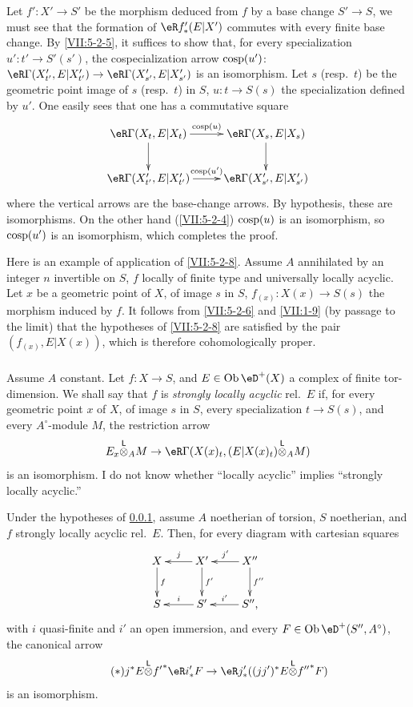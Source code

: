 Let $f':X'\to S'$ be the morphism deduced from $f$ by a base change
$S'\to S$, we must see that the formation of $\eR f_\ast'(E|X')$ commutes
with every finite base change. By \ref{VII:5-2-5}, it suffices to
show that, for every specialization $u':t'\to S'(s')$, the
cospecialization arrow $\operatorname{cosp}(u')$:
$\eR\Gamma(X_{t'}',E|X_{t'}') \to \eR\Gamma(X_{s'}',E|X_{s'}')$ is an
isomorphism. Let $s$ (resp.\ $t$) be the geometric point image of $s$
(resp.\ $t$) in $S$, $u:t\to S(s)$ the specialization defined by $u'$.
One easily sees that one has a commutative square
\[\xymatrix{
  \eR\Gamma(X_t,E|X_t) \ar[r]^-{\cosp(u)} \ar[d]
    & \eR\Gamma(X_s,E|X_s) \ar[d] \\
  \eR\Gamma(X_{t'}',E|X_{t'}') \ar[r]^-{\cosp(u')}
    & \eR\Gamma(X_{s'}',E|X_{s'}')
}\]
where the vertical arrows are the base-change arrows. By
hypothesis, these are isomorphisms. On the other hand (\ref{VII:5-2-4})
$\operatorname{cosp}(u)$ is an isomorphism, so $\operatorname{cosp}(u')$ is an isomorphism, which
completes the proof.

Here is an example of application of \ref{VII:5-2-8}. Assume $A$ annihilated by
an integer $n$ invertible on $S$, $f$ locally of finite type and
universally locally acyclic. Let $x$ be a geometric point of
$X$, of image $s$ in $S$, $f_{(x)}:X(x)\to S(s)$ the morphism induced by $f$.
It follows from \ref{VII:5-2-6} and \ref{VII:1-9} (by passage to the limit)
that the hypotheses of \ref{VII:5-2-8} are satisfied by the pair
$(f_{(x)},E|X(x))$, which is therefore cohomologically proper.




\subsubsection{}\label{VII:5-2-9}

Assume $A$ constant. Let $f:X\to S$, and $E\in\ob\eD^+(X)$ a complex of
finite tor-dimension. We shall say that $f$ is \emph{strongly locally
acyclic} rel.\ $E$ if, for every geometric point $x$ of $X$,
of image $s$ in $S$, every specialization $t\to S(s)$, and every
$A^\circ$-module $M$, the restriction arrow
\[
  E_x\lotimes_A M \to \eR\Gamma(X(x)_t,(E|X(x)_t)\lotimes_A M)
\]
is an isomorphism. I do not know whether ``locally acyclic'' implies
``strongly locally acyclic.''




\begin{proposition}\label{VII:5-2-10}
Under the hypotheses of \ref{VII:5-2-9}, assume $A$ noetherian of
torsion, $S$ noetherian, and $f$ strongly locally acyclic rel.\ $E$.
Then, for every diagram with cartesian squares
\[\xymatrix{
  X \ar[d]^-f
    & \ar[l]_-j X' \ar[d]^-{f'}
    & \ar[l]_-{j'} X'' \ar[d]^-{f''} \\
  S
    & \ar[l]_-i S'
    & \ar[l]_-{i'} S'' \text{,}
}\]
with $i$ quasi-finite and $i'$ an open immersion, and every
$F\in\ob\eD^+(S'',A^\circ)$, the canonical arrow
\begin{equation*}\tag{$*$}\label{VII:eq:5-2-10-1}
  j^\ast E \lotimes {f'}^\ast \eR i_\ast' F \to \eR j_\ast' ((j j')^\ast E\lotimes {f''}^\ast F)
\end{equation*}
is an isomorphism.
\end{proposition}

